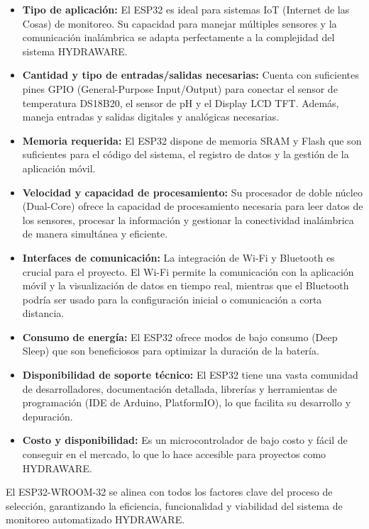 \documentclass[a4paper,12pt]{article}
\begin{document}
	\begin{itemize}
		\item \textbf{Tipo de aplicación:} El ESP32 es ideal para sistemas IoT (Internet de las Cosas) de monitoreo. Su capacidad para manejar múltiples sensores y la comunicación inalámbrica se adapta perfectamente a la complejidad del sistema HYDRAWARE.
		\item \textbf{Cantidad y tipo de entradas/salidas necesarias:} Cuenta con suficientes pines GPIO (General-Purpose Input/Output) para conectar el sensor de temperatura DS18B20, el sensor de pH y el Display LCD TFT. Además, maneja entradas y salidas digitales y analógicas necesarias.
		\item \textbf{Memoria requerida:} El ESP32 dispone de memoria SRAM y Flash que son suficientes para el código del sistema, el registro de datos y la gestión de la aplicación móvil.
		\item \textbf{Velocidad y capacidad de procesamiento:} Su procesador de doble núcleo (Dual-Core) ofrece la capacidad de procesamiento necesaria para leer datos de los sensores, procesar la información y gestionar la conectividad inalámbrica de manera simultánea y eficiente.
		\item \textbf{Interfaces de comunicación:} La integración de Wi-Fi y Bluetooth es crucial para el proyecto. El Wi-Fi permite la comunicación con la aplicación móvil y la visualización de datos en tiempo real, mientras que el Bluetooth podría ser usado para la configuración inicial o comunicación a corta distancia.
		\item \textbf{Consumo de energía:} El ESP32 ofrece modos de bajo consumo (Deep Sleep) que son beneficiosos para optimizar la duración de la batería.
		\item \textbf{Disponibilidad de soporte técnico:} El ESP32 tiene una vasta comunidad de desarrolladores, documentación detallada, librerías y herramientas de programación (IDE de Arduino, PlatformIO), lo que facilita su desarrollo y depuración.
		\item \textbf{Costo y disponibilidad:} Es un microcontrolador de bajo costo y fácil de conseguir en el mercado, lo que lo hace accesible para proyectos como HYDRAWARE.
	\end{itemize}
	
	El ESP32-WROOM-32 se alinea con todos los factores clave del proceso de selección, garantizando la eficiencia, funcionalidad y viabilidad del sistema de monitoreo automatizado HYDRAWARE.
	\vspace{0.5cm}
	
\end{document}
